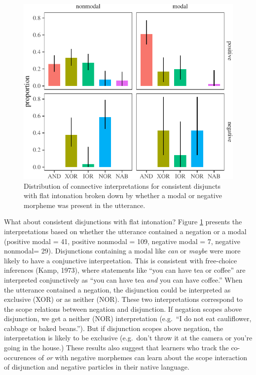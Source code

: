 \documentclass[
  english,
  ,man,floatsintext]{apa6}
\begin{document}
\begin{figure}[tb]

{\centering \includegraphics{figs/negModalPlot-1} 

}

\caption{Distribution of connective interpretations for consistent disjuncts with flat intonation broken down by whether a modal or negative morpheme was present in the utterance.}\label{fig:negModalPlot}
\end{figure}

What about consistent disjunctions with flat intonation? Figure \ref{fig:negModalPlot} presents the interpretations based on whether the utterance contained a negation or a modal (positive modal = 41, positive nonmodal = 109, negative modal = 7, negative nonmodal= 29). Disjunctions containing a modal like \emph{can} or \emph{maybe} were more likely to have a conjunctive interpretation. This is consistent with free-choice inferences (Kamp, 1973), where statements like ``you can have tea or coffee'' are interpreted conjunctively as ``you can have tea \emph{and} you can have coffee.'' When the utterance contained a negation, the disjunction could be interpreted as exclusive (XOR) or as neither (NOR). These two interpretations correspond to the scope relations between negation and disjunction. If negation scopes above disjunction, we get a neither (NOR) interpretation (e.g.~``I do not eat cauliflower, cabbage or baked beans.''). But if disjunction scopes above negation, the interpretation is likely to be exclusive (e.g.~don't throw it at the camera or you're going in the house.) These results also suggest that learners who track the co-occurences of \emph{or} with negative morphemes can learn about the scope interaction of disjunction and negative particles in their native language.
\end{document}
